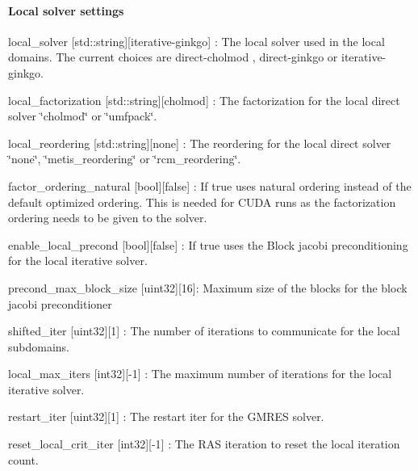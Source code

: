 \paragraph*{Local solver settings}


\begin{DoxyItemize}
\item {\ttfamily local\+\_\+solver} \mbox{[}std\+::string\mbox{]}\mbox{[}iterative-\/ginkgo\mbox{]} \+: The local solver used in the local domains. The current choices are {\ttfamily direct-\/cholmod} , {\ttfamily direct-\/ginkgo} or {\ttfamily iterative-\/ginkgo}.
\item {\ttfamily local\+\_\+factorization} \mbox{[}std\+::string\mbox{]}\mbox{[}cholmod\mbox{]} \+: The factorization for the local direct solver \char`\"{}cholmod\char`\"{} or \char`\"{}umfpack\char`\"{}.
\item {\ttfamily local\+\_\+reordering} \mbox{[}std\+::string\mbox{]}\mbox{[}none\mbox{]} \+: The reordering for the local direct solver \char`\"{}none\char`\"{}, \char`\"{}metis\+\_\+reordering\char`\"{} or \char`\"{}rcm\+\_\+reordering\char`\"{}.
\item {\ttfamily factor\+\_\+ordering\+\_\+natural} \mbox{[}bool\mbox{]}\mbox{[}false\mbox{]} \+: If true uses natural ordering instead of the default optimized ordering. This is needed for C\+U\+DA runs as the factorization ordering needs to be given to the solver.
\item {\ttfamily enable\+\_\+local\+\_\+precond} \mbox{[}bool\mbox{]}\mbox{[}false\mbox{]} \+: If true uses the Block jacobi preconditioning for the local iterative solver.
\item {\ttfamily precond\+\_\+max\+\_\+block\+\_\+size} \mbox{[}uint32\mbox{]}\mbox{[}16\mbox{]}\+: Maximum size of the blocks for the block jacobi preconditioner
\item {\ttfamily shifted\+\_\+iter} \mbox{[}uint32\mbox{]}\mbox{[}1\mbox{]} \+: The number of iterations to communicate for the local subdomains.
\item {\ttfamily local\+\_\+max\+\_\+iters} \mbox{[}int32\mbox{]}\mbox{[}-\/1\mbox{]} \+: The maximum number of iterations for the local iterative solver.
\item {\ttfamily restart\+\_\+iter} \mbox{[}uint32\mbox{]}\mbox{[}1\mbox{]} \+: The restart iter for the G\+M\+R\+ES solver.
\item {\ttfamily reset\+\_\+local\+\_\+crit\+\_\+iter} \mbox{[}int32\mbox{]}\mbox{[}-\/1\mbox{]} \+: The R\+AS iteration to reset the local iteration count.
\end{DoxyItemize}

